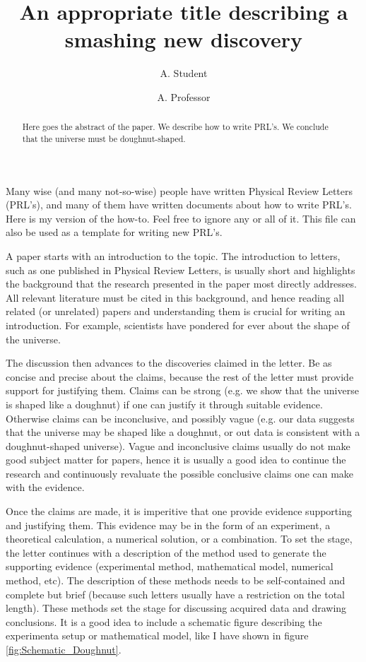 \documentclass[twocolumn,prl]{revtex4-1}
\begin{document}
\title{An appropriate title describing a smashing new discovery}
\author{A. Student}
\author{A. Professor}
\begin{abstract}
Here goes the abstract of the paper. We describe how to write PRL's. We conclude that the universe must be doughnut-shaped.
\end{abstract}
\maketitle

Many wise (and many not-so-wise) people have written Physical Review Letters (PRL's), and many of them have written documents about how to write PRL's. Here is my version of the how-to. Feel free to ignore any or all of it. This file can also be used as a template for writing new PRL's.

A paper starts with an introduction to the topic. The introduction to letters, such as one published in Physical Review Letters, is usually short and highlights the background that the research presented in the paper most directly addresses. All relevant literature must be cited in this background, and hence reading all related (or unrelated) papers and understanding them is crucial for writing an introduction. For example, scientists have pondered for ever about the shape of the universe\cite{aurich2004can,ellis2003shape,adams2001shape,gomero2000signature,cornish1998can}.

The discussion then advances to the discoveries claimed in the letter. Be as concise and precise about the claims, because the rest of the letter must provide support for justifying them. Claims can be strong (e.g. we show that the universe is shaped like a doughnut) if one can justify it through suitable evidence. Otherwise claims can be inconclusive, and possibly vague (e.g. our data suggests that the universe may be shaped like a doughnut, or out data is consistent with a doughnut-shaped universe). Vague and inconclusive claims usually do not make good subject matter for papers, hence it is usually a good idea to continue the research and continuously revaluate the possible conclusive claims one can make with the evidence.

Once the claims are made, it is imperitive that one provide evidence supporting and justifying them. This evidence may be in the form of an experiment, a theoretical calculation, a numerical solution, or a combination. To set the stage, the letter continues with a description of the method used to generate the supporting evidence (experimental method, mathematical model, numerical method, etc). The description of these methods needs to be self-contained and complete but brief (because such letters usually have a restriction on the total length). These methods set the stage for discussing acquired data and drawing conclusions. It is a good idea to include a schematic figure describing the experimenta setup or mathematical model, like I have shown in figure \ref{fig:Schematic_Doughnut}.
\end{document}
